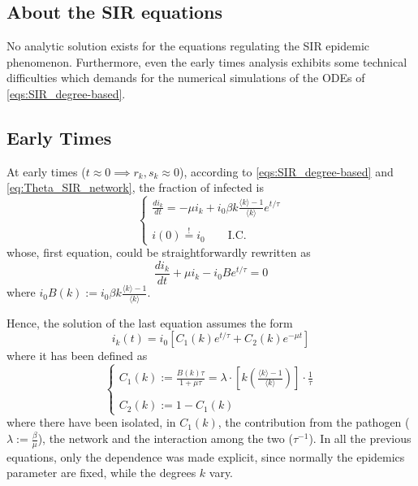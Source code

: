 \documentclass[a4paper,10pt,twoside]{book} %
\theoremstyle{definition}
\begin{document}
\subsection*{About the SIR equations}

No analytic solution exists for the equations regulating the SIR epidemic phenomenon. Furthermore, even the early times analysis exhibits some technical difficulties which demands for the numerical simulations of the ODEs of \autoref{eqs:SIR_degree-based}.

\subsection*{Early Times}
At early times ($t\approx 0 \implies r_k, s_k\approx0$), according to \autoref{eqs:SIR_degree-based} and \autoref{eq:Theta_SIR_network}, the fraction of infected is \vspace{3mm}
\begin{equation}
	\begin{cases}
		\frac{di_k}{dt} = - \mu i_k + i_0 \beta k \frac{\langle k \rangle -1}{\langle k \rangle } e^{t/\tau} \\ \\
		i(0) \stackrel{!}{=} i_0 \qquad \text{I.C.}
	\end{cases}
\end{equation}
whose, first equation, could be straightforwardly rewritten as
\begin{equation}
	\frac{d i_k}{dt} + \mu i_k - i_0 B e^{t/\tau} = 0
\end{equation}
where $i_0 B(k) := i_0 \beta k \frac{\langle k \rangle -1}{\langle k \rangle }$.

Hence, the solution of the last equation assumes the form
\begin{equation}
	i_k(t)=i_0 \left[C_1(k)e^{t/\tau} + C_2(k) e^{-\mu t}\right]
\end{equation}
where it has been defined as \vspace{3mm}
\begin{equation*}
	\begin{cases}
		C_1(k):= \frac{B(k) \tau}{1+ \mu \tau} = \lambda \cdot \left[k\left(\frac{\langle k \rangle -1}{\langle k \rangle }\right)\right]
		\cdot \frac{1}{\tau} \\ \\
		C_2(k):= 1 - C_1(k)
	\end{cases}
\end{equation*}
where there have been isolated, in $C_1(k)$,  the contribution from the pathogen ($\lambda:=\frac{\beta}{\mu}$), the network and the interaction among the two ($\tau^{-1}$). In all the previous equations, only the dependence was made explicit, since normally the epidemics parameter are fixed, while the degrees $k$ vary.
\end{document}
